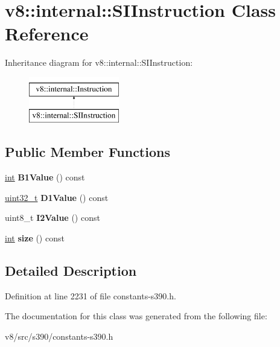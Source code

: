\hypertarget{classv8_1_1internal_1_1SIInstruction}{}\section{v8\+:\+:internal\+:\+:S\+I\+Instruction Class Reference}
\label{classv8_1_1internal_1_1SIInstruction}
Inheritance diagram for v8\+:\+:internal\+:\+:S\+I\+Instruction\+:\begin{figure}[H]
\begin{center}
\leavevmode
\includegraphics[height=2.000000cm]{classv8_1_1internal_1_1SIInstruction}
\end{center}
\end{figure}
\subsection*{Public Member Functions}
\begin{DoxyCompactItemize}
\item 
\mbox{\label{classv8_1_1internal_1_1SIInstruction_a6f4d771b25dd6928997c5a581953cae0}} 
\mbox{\hyperlink{classint}{int}} {\bfseries B1\+Value} () const
\item 
\mbox{\label{classv8_1_1internal_1_1SIInstruction_a7c9bea0a3b95b1f0a660a21469da9b52}} 
\mbox{\hyperlink{classuint32__t}{uint32\+\_\+t}} {\bfseries D1\+Value} () const
\item 
\mbox{\label{classv8_1_1internal_1_1SIInstruction_a1d096b82577a730a6842334f665f229e}} 
uint8\+\_\+t {\bfseries I2\+Value} () const
\item 
\mbox{\label{classv8_1_1internal_1_1SIInstruction_aee4d4b264f2e1e535476800c3d1c7ada}} 
\mbox{\hyperlink{classint}{int}} {\bfseries size} () const
\end{DoxyCompactItemize}


\subsection{Detailed Description}


Definition at line 2231 of file constants-\/s390.\+h.



The documentation for this class was generated from the following file\+:\begin{DoxyCompactItemize}
\item 
v8/src/s390/constants-\/s390.\+h\end{DoxyCompactItemize}

